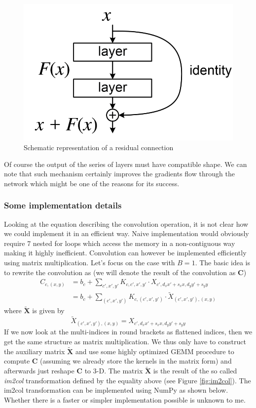 \documentclass[a5paper]{article}
\begin{document}
\begin{figure}[ht]
   \centering
   \includegraphics[width=0.55\columnwidth]{figs/residual.png}
   \caption{Schematic representation of a residual connection}
   \label{fig:residual}
\end{figure}

Of course the output of the series of layers must have compatible shape. We can note that such
mechanism certainly improves the gradients flow through the network which might be one of the
reasons for its success.

\subsubsection{Some implementation details}

Looking at the equation describing the convolution operation, it is not clear how we could implement
it in an efficient way. Naive implementation would obviously require 7 nested for loops which access
the memory in a non-contiguous way making it highly inefficient. Convolution can however be
implemented efficiently using matrix multiplication. Let's focus on the case with $B = 1$. The basic
idea is to rewrite the convolution as (we will denote the result of the convolution as $\bm{C}$)
\[
\begin{split}
   C_{c, (x,y)} & = b_c + \sum_{c',x',y'} K_{c,c',x',y'} \cdot X_{c',d_x x' + s_x x, d_y y' + s_y y} \\
                & = b_c + \sum_{(c',x',y')} K_{c, (c',x',y')} \cdot \tilde{X}_{(c',x',y'), (x,y)}
\end{split}
\]
where $\bm{\tilde{X}}$ is given by
\[
   \tilde{X}_{(c',x',y'), (x,y)} =  X_{c',d_x x' + s_x x, d_y y' + s_y y}
\]
If we now look at the multi-indices in round brackets as flattened indices, then we get the same
structure as matrix multiplication. We thus only have to construct the auxiliary matrix
$\bm{\tilde{X}}$ and use some highly optimized GEMM procedure to compute $\bm{C}$ (assuming we
already store the kernels in the matrix form) and afterwards just reshape $\bm{C}$ to 3-D. The
matrix $\bm{\tilde{X}}$ is the result of the so called \emph{im2col} transformation defined by the
equality above (see Figure \ref{fig:im2col}). The im2col transformation can be implemented using
NumPy as shown below. Whether there is a faster or simpler implementation possible is unknown to me.
\end{document}
